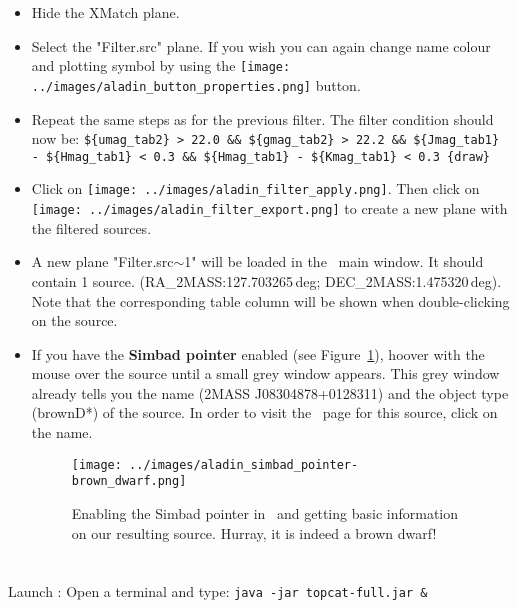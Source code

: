 \documentclass [a4paper, 12pt]{article}
\begin{document}
\begin{itemize}
    \item Hide the XMatch plane.
    \item Select the "Filter.src" plane. If you wish you can again change name
    colour and plotting symbol by using the \texttt{[image: ../images/aladin\_button\_properties.png]} button.
    \item Repeat the same steps as for the previous filter. The filter
    condition should now be: \texttt{\$\{umag\_tab2\} > 22.0 \&\&
    \$\{gmag\_tab2\} > 22.2 \&\& \$\{Jmag\_tab1\} - \$\{Hmag\_tab1\} < 0.3 \&\&
    \$\{Hmag\_tab1\} - \$\{Kmag\_tab1\} < 0.3 \{draw\}}
    \item Click on \texttt{[image: ../images/aladin\_filter\_apply.png]}. Then click on
    \texttt{[image: ../images/aladin\_filter\_export.png]} to create a new plane with
    the filtered sources.
    \item A new plane "Filter.src$\sim$1" will be loaded in the \aladin\ main
    window. It should contain 1 source. (RA\_2MASS:127.703265\,deg;
    DEC\_2MASS:1.475320\,deg). Note that the corresponding table column will be
    shown when double-clicking on the source.
    \item If you have the \textbf{Simbad pointer} enabled (see
    Figure~\ref{fig:simbadpointer_aladin}), hoover with the mouse over the
    source until a small grey window appears. This grey window already tells
    you the name (2MASS J08304878+0128311) and the object type (brownD*) of the
    source. In order to visit the \simbad\ page for this source, click on the
    name.
    \begin{figure}[H]
        \center
        \texttt{[image: ../images/aladin\_simbad\_pointer-brown\_dwarf.png]}
        \caption{Enabling the Simbad pointer in \aladin\ and getting basic
        information on our resulting source. Hurray, it is indeed a brown
        dwarf!}
        \label{fig:simbadpointer_aladin}
    \end{figure}
\end{itemize}

\section{\topcat}
Launch \topcat: Open a terminal and type: \texttt{java -jar topcat-full.jar \&}
\\
\end{document}

